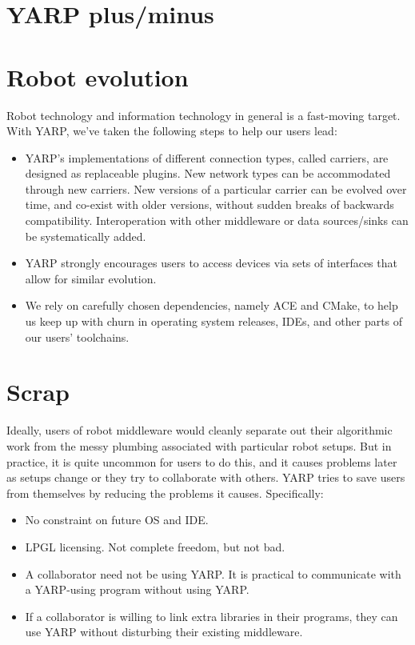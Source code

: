 \documentclass[letterpaper]{article}
\begin{document}
\section{YARP plus/minus}


\section{Robot evolution}

Robot technology and information technology in general is a
fast-moving target.  With YARP, we've taken the following steps to
help our users lead:

\begin{itemize}

\item YARP's implementations of different connection types, called
carriers, are designed as replaceable plugins.  New network types can
be accommodated through new carriers.  New versions of a particular
carrier can be evolved over time, and co-exist with older versions,
without sudden breaks of backwards compatibility.  Interoperation
with other middleware or data sources/sinks can be systematically
added.

\item YARP strongly encourages users to access devices via sets of
interfaces that allow for similar evolution.

\item We rely on carefully chosen dependencies, namely ACE and CMake,
to help us keep up with churn in operating system releases, IDEs, and
other parts of our users' toolchains.

\end{itemize}

\section{Scrap}


Ideally, users of robot middleware would cleanly separate out their
algorithmic work from the messy plumbing associated with particular
robot setups.  But in practice, it is quite uncommon for users to do
this, and it causes problems later as setups change or they try to
collaborate with others.  YARP tries to save users from themselves
by reducing the problems it causes.  Specifically:

\begin{itemize}

\item No constraint on future OS and IDE.

\item LPGL licensing.  Not complete freedom, but not bad.

\item A collaborator need not be using YARP.  It is practical to
communicate with a YARP-using program without using YARP.

\item If a collaborator is willing to link extra libraries in their
programs, they can use YARP without disturbing their existing
middleware.

\end{itemize}
\end{document}
